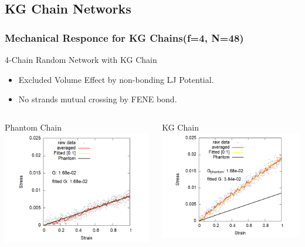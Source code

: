 \documentclass[12pt, dvipdfmx]{beamer}
\begin{document}
\subsection{KG Chain Networks}
\begin{frame}
	\frametitle{Mechanical Responce for KG Chains(f=4, N=48)}
	\vspace{-3mm}
	\begin{alertblock}{4-Chain Random Network with KG Chain}
		\begin{itemize}
			\item Excluded Volume Effect by non-bonding LJ Potential.
			\item No strands mutual crossing by FENE bond.
		\end{itemize}
	\end{alertblock}
	\vspace{-4mm}
	\begin{columns}[T, onlytextwidth]
			\begin{block}{Phantom Chain}
				\includegraphics[width=\textwidth]{4chain_N50_PNM_shear.png}
			\end{block}
			
			\begin{block}{KG Chain}
				\includegraphics[width=\textwidth]{4chain_N50_shear.png}
			\end{block}
	\end{columns}


\end{frame}
\end{document}
